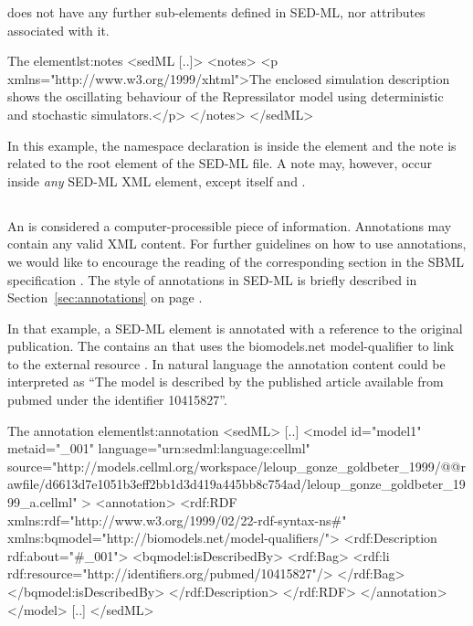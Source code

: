  does not have any further sub-elements defined in SED-ML, nor attributes associated with it.


\begin{myXmlLst}{The  element}{lst:notes}
<sedML [..]>
	<notes>
  		<p xmlns="http://www.w3.org/1999/xhtml">The enclosed simulation description shows the oscillating behaviour of the Repressilator model using deterministic and stochastic simulators.</p>
	</notes>
</sedML>
\end{myXmlLst}

In this example, the namespace declaration is inside the  element and the note is related to the  root element of the SED-ML file. A note may, however, occur inside \emph{any} SED-ML XML element, except  itself and \hyperref[class:annotation]{}.


\subsection{}
\label{class:annotation}

An  is considered a computer-processible piece of information. Annotations may contain any valid XML content. For further guidelines on how to use annotations, we would like to encourage the reading of the corresponding section in the SBML specification \citep[pp. 14-16]{HBH+10}. The style of annotations in SED-ML is briefly described in Section~\ref{sec:annotations} on page \pageref{sec:annotations}.

 In that example, a SED-ML \hyperref[class:model]{} element is annotated with a reference to the original publication. The  contains an  that uses the biomodels.net model-qualifier  to link to the external resource . In natural language the annotation content could be interpreted as ``The model is described by the published article available from pubmed under the identifier 10415827''.

\begin{myXmlLst}{The annotation element}{lst:annotation}
<sedML>
	[..]
	<model id="model1" metaid="_001" language="urn:sedml:language:cellml" source="http://models.cellml.org/workspace/leloup_gonze_goldbeter_1999/@@rawfile/d6613d7e1051b3eff2bb1d3d419a445bb8c754ad/leloup_gonze_goldbeter_1999_a.cellml" >
		<annotation>
    		<rdf:RDF xmlns:rdf="http://www.w3.org/1999/02/22-rdf-syntax-ns#" xmlns:bqmodel="http://biomodels.net/model-qualifiers/">
				<rdf:Description rdf:about="#_001">
				<bqmodel:isDescribedBy>
				<rdf:Bag>
					<rdf:li rdf:resource="http://identifiers.org/pubmed/10415827"/>
				</rdf:Bag>
				</bqmodel:isDescribedBy>
    			</rdf:Description>
			</rdf:RDF>
		</annotation>
	</model>
	[..]
</sedML>
\end{myXmlLst}


